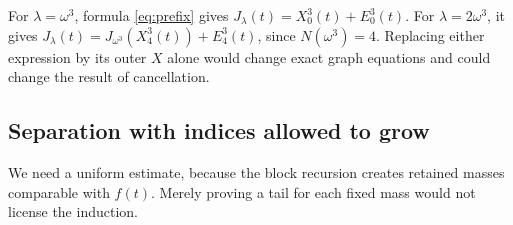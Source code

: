 \documentclass[11pt]{article}
\begin{document}
\begin{example}
For $\lambda=\omega^3$, formula \eqref{eq:prefix} gives
$J_\lambda(t)=X^3_0(t)+E^3_0(t)$. For $\lambda=2\omega^3$, it gives
$J_\lambda(t)=J_{\omega^3}(X^3_4(t))+E^3_4(t)$, since
$N(\omega^3)=4$. Replacing either expression by its outer $X$ alone would
change exact graph equations and could change the result of cancellation.
\end{example}

\subsection{Separation with indices allowed to grow}
We need a uniform estimate, because the block recursion creates retained
masses comparable with $f(t)$. Merely proving a tail for each fixed mass
would not license the induction.
\end{document}
